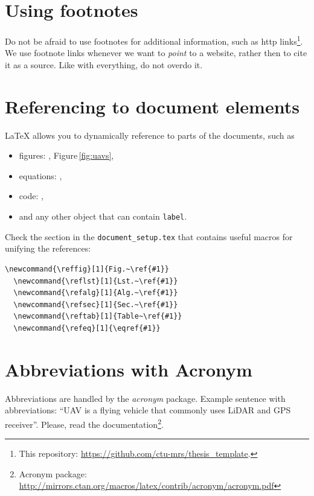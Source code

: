 \section{Using footnotes}

Do not be afraid to use footnotes for additional information, such as http links\footnote{This repository: \url{https://github.com/ctu-mrs/thesis_template}.}.
We use footnote links whenever we want to \emph{point} to a website, rather then to cite it as a source.
Like with everything, do not overdo it.

\section{Referencing to document elements}

LaTeX allows you to dynamically reference to parts of the documents, such as
\begin{itemize}
  \item figures: , Figure\,\ref{fig:uavs},
  \item equations: ,
  \item code: ,
  \item and any other object that can contain \texttt{label}.
\end{itemize}

Check the section in the \texttt{document\_setup.tex} that contains useful macros for unifying the references:

\begin{lstlisting}[caption={LaTeX macros for referencing to document elements.},label={lst:references}]
  \newcommand{\reffig}[1]{Fig.~\ref{#1}}
  \newcommand{\reflst}[1]{Lst.~\ref{#1}}
  \newcommand{\refalg}[1]{Alg.~\ref{#1}}
  \newcommand{\refsec}[1]{Sec.~\ref{#1}}
  \newcommand{\reftab}[1]{Table~\ref{#1}}
  \newcommand{\refeq}[1]{\eqref{#1}}
\end{lstlisting}

\section{Abbreviations with Acronym}

Abbreviations are handled by the \emph{acronym} package.
Example sentence with abbreviations: ``\ac{UAV} is a flying vehicle that commonly uses \ac{LiDAR} and \ac{GPS} receiver''.
Please, read the documentation\footnote{Acronym package: \url{http://mirrors.ctan.org/macros/latex/contrib/acronym/acronym.pdf}}.


